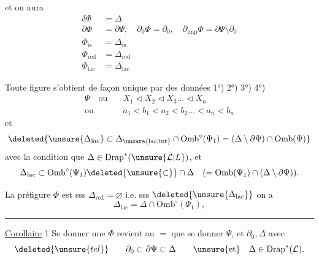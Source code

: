 

et on aura
\[
\begin{aligned}
\delta\Phi&=\Delta\\
\partial\Phi&=\partial\Psi,\quad\partial_0\Phi=\partial_0,\quad\partial_{\mathrm{imp}}\Phi=\partial\Psi\setminus\partial_0\\
\Phi_{\mathrm{is}}&=\Delta_{\mathrm{is}}\\
\Phi_{\mathrm{red}}&=\Delta_{\mathrm{red}}\\
\Phi_{\mathrm{lac}}&=\Delta_{\mathrm{lac}}
\end{aligned}
\]

Toute figure s'obtient de façon unique par des données 1°) 2°) 3°) 4°)
\[
\begin{aligned}
\Psi\quad\text{ou}\quad&X_1\lhd X_2\lhd X_3\ldots\lhd X_n\\
\text{ou}\quad&a_1<b_1<a_2<b_2\ldots<a_n<b_n
\end{aligned}
\]
et
\[
\deleted{\unsure{\Delta_{\mathrm{lac}}}\subset\Delta_{\unsure{\mathrm{lac}|\mathrm{int}}}\cap\mathrm{Omb}^{\circ}(\Psi_1)=(\Delta\setminus\partial\Psi)\cap\mathrm{Omb}(\Psi)}
\]
avec la condition que $\Delta\in\mathrm{Drap}^{*}(\unsure{\mathcal{L}|L})$, et
\[
\Delta_{\mathrm{lac}}\subset\mathrm{Omb}^{\circ}(\Psi_1)\deleted{\unsure{\subset}}\cap\Delta\quad(=\mathrm{Omb}(\Psi_1)\cap(\Delta\setminus\partial\Psi)).
\]

La préfigure $\Phi$ est  sss $\Delta_{\mathrm{red}}=\varnothing$ i.e. sss $\deleted{\unsure{\Delta_{\mathrm{lac}}}}$ on a
\[
\Delta_{\mathrm{lac}}=\Delta\cap\mathrm{Omb}^{\circ}(\Psi_1),
\]

\noindent\begin{minipage}{.025\linewidth}\rule{.5pt}{4\baselineskip}\end{minipage}\begin{minipage}{.95\linewidth}
\uline{Corollaire} 1 Se donner une  $\Phi$  revient au $=$ que se donner $\Psi$, et $\partial_0,\Delta$ avec
\[
\deleted{\unsure{tel}}\qquad\partial_0\subset\partial\Psi\subset\Delta\qquad\unsure{\text{et}}\quad\Delta\in\mathrm{Drap}^{*}(\mathcal{L}).
\]
\end{minipage}
